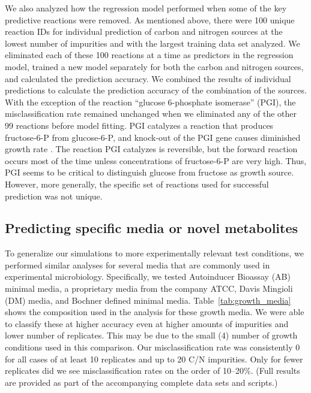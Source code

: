 \documentclass[12pt]{article}
\begin{document}
We also analyzed how the regression model performed when some of the key predictive reactions were removed. As mentioned above, there were 100 unique reaction IDs for individual prediction of carbon and nitrogen sources at the lowest number of impurities and with the largest training data set analyzed. We eliminated each of these 100 reactions at a time as predictors in the regression model, trained a new model separately for both the carbon and nitrogen sources, and calculated the prediction accuracy. We combined the results of individual predictions to calculate the prediction accuracy of the combination of the sources. With the exception of the reaction ``glucose 6-phosphate isomerase'' (PGI), the misclassification rate remained unchanged when we eliminated any of the other 99 reactions before model fitting. PGI catalyzes a reaction that produces fructose-6-P from glucose-6-P, and knock-out of the PGI gene causes diminished growth rate \cite{Canonacoetal2001}. The reaction PGI catalyzes is reversible, but the forward reaction occurs most of the time unless concentrations of fructose-6-P are very high. Thus, PGI seems to be critical to distinguish glucose from fructose as growth source. However, more generally, the specific set of reactions used for successful prediction was not unique.


\subsection*{Predicting specific media or novel metabolites}

To generalize our simulations to more experimentally relevant test conditions, we performed similar analyses for several media that are commonly used in experimental microbiology. Specifically, we tested Autoinducer Bioassay (AB) minimal media, a proprietary media from the company ATCC, Davis Mingioli (DM) media, and Bochner defined minimal media. Table~\ref{tab:growth_media} shows the composition used in the analysis for these growth media. We were able to classify these at higher accuracy even at higher amounts of impurities and lower number of replicates. This may be due to the small (4) number of growth conditions used in this comparison. Our misclassification rate was consistently 0 for all cases of at least 10 replicates and up to 20 C/N impurities. Only for fewer replicates did we see misclassification rates on the order of 10--20\%. (Full results are provided as part of the accompanying complete data sets and scripts.)
\end{document}
